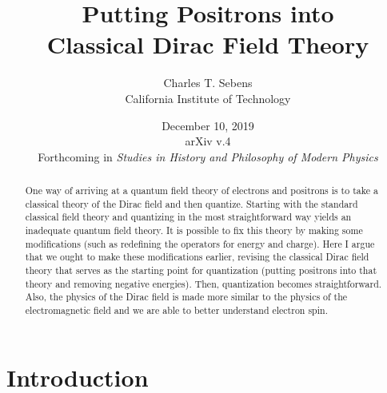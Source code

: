 \documentclass[onecolumn,secnumarabic,amsmath,amssymb,balancelastpage,nofootinbib]{article}
\begin{document}
\sloppy %




\title{\vspace*{-35 pt}\Huge{Putting Positrons into\\Classical Dirac Field Theory}}
\author{Charles T. Sebens\\California Institute of Technology}
\date{December 10, 2019\\ arXiv v.4\\\vspace{10 pt}Forthcoming in \emph{Studies in History and Philosophy of Modern Physics}}


\maketitle
\vspace*{-20 pt}
\begin{abstract}
One way of arriving at a quantum field theory of electrons and positrons is to take a classical theory of the Dirac field and then quantize.  Starting with the standard classical field theory and quantizing in the most straightforward way yields an inadequate quantum field theory.  It is possible to fix this theory by making some modifications (such as redefining the operators for energy and charge).  Here I argue that we ought to make these modifications earlier, revising the classical Dirac field theory that serves as the starting point for quantization (putting positrons into that theory and removing negative energies).  Then, quantization becomes straightforward.  Also, the physics of the Dirac field is made more similar to the physics of the electromagnetic field and we are able to better understand electron spin.
\end{abstract}

\tableofcontents
{}
\newpage


\section{Introduction}\label{introsec}
\end{document}
